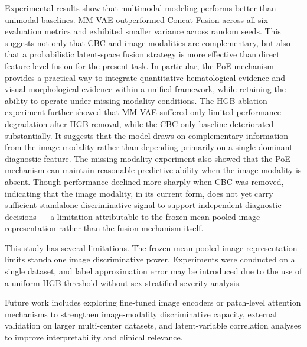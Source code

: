 \documentclass[conference]{IEEEtran}
\begin{document}
Experimental results show that multimodal modeling performs better than unimodal baselines. MM-VAE outperformed Concat Fusion across all six evaluation metrics and exhibited smaller variance across random seeds. This suggests not only that CBC and image modalities are complementary, but also that a probabilistic latent-space fusion strategy is more effective than direct feature-level fusion for the present task. In particular, the PoE mechanism provides a practical way to integrate quantitative hematological evidence and visual morphological evidence within a unified framework, while retaining the ability to operate under missing-modality conditions. The HGB ablation experiment further showed that MM-VAE suffered only limited performance degradation after HGB removal, while the CBC-only baseline deteriorated substantially. It suggests that the model draws on complementary information from the image modality rather than depending primarily on a single dominant diagnostic feature. The missing-modality experiment also showed that the PoE mechanism can maintain reasonable predictive ability when the image modality is absent. Though performance declined more sharply when CBC was removed, indicating that the image modality, in its current form, does not yet carry sufficient standalone discriminative signal to support independent diagnostic decisions --- a limitation attributable to the frozen mean-pooled image representation rather than the fusion mechanism itself.

This study has several limitations. The frozen mean-pooled image representation limits standalone image discriminative power. Experiments were conducted on a single dataset, and label approximation error may be introduced due to the use of a uniform HGB threshold without sex-stratified severity analysis.

Future work includes exploring fine-tuned image encoders or patch-level attention mechanisms to strengthen image-modality discriminative capacity, external validation on larger multi-center datasets, and latent-variable correlation analyses to improve interpretability and clinical relevance.
\end{document}

